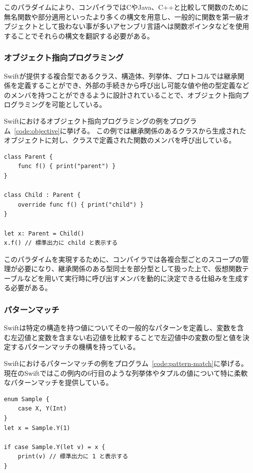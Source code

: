 このパラダイムにより、コンパイラではCやJava、C++と比較して関数のために無名関数や部分適用といったより多くの構文を用意し、一般的に関数を第一級オブジェクトとして扱わない事が多いアセンブリ言語へは関数ポインタなどを使用することでそれらの構文を翻訳する必要がある。

\subsubsection{オブジェクト指向プログラミング}

Swiftが提供する複合型であるクラス、構造体、列挙体、プロトコルでは継承関係を定義することができ、外部の手続きから呼び出し可能な値や他の型定義などのメンバを持つことができるように設計されていることで、オブジェクト指向プログラミングを可能としている。

Swiftにおけるオブジェクト指向プログラミングの例をプログラム~\ref{code:objective}に挙げる。
この例では継承関係のあるクラスから生成されたオブジェクトに対し、クラスで定義された関数のメンバを呼び出している。

\begin{lstlisting}[caption=Swiftにおけるオブジェクト指向プログラミングの例, label=code:objective]
class Parent {
    func f() { print("parent") }
}

class Child : Parent {
    override func f() { print("child") }
}

let x: Parent = Child()
x.f() // 標準出力に child と表示する
\end{lstlisting}

このパラダイムを実現するために、コンパイラでは各複合型ごとのスコープの管理が必要になり、継承関係のある型同士を部分型として扱った上で、仮想関数テーブルなどを用いて実行時に呼び出すメンバを動的に決定できる仕組みを生成する必要がある。

\subsubsection{パターンマッチ}

Swiftは特定の構造を持つ値についてその一般的なパターンを定義し、変数を含む左辺値と変数を含まない右辺値を比較することで左辺値中の変数の型と値を決定するパターンマッチの機構を持っている。

Swiftにおけるパターンマッチの例をプログラム~\ref{code:pattern-match}に挙げる。
現在のSwiftではこの例内の6行目のような列挙体やタプルの値について特に柔軟なパターンマッチを提供している。

\begin{lstlisting}[caption=Swiftにおけるパターンマッチの例, label=code:pattern-match]
enum Sample {
    case X, Y(Int)
}
let x = Sample.Y(1)

if case Sample.Y(let v) = x {
    print(v) // 標準出力に 1 と表示する
}
\end{lstlisting}

